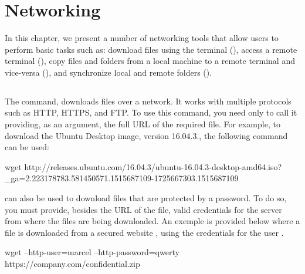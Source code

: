 \chapter{Networking}\label{ch:networking1}

In this chapter, we present a number of networking tools that allow users to perform basic tasks such as: download files using the terminal (), access a remote terminal (), copy files and folders from a local machine to a remote terminal and vice-versa (), and synchronize local and remote folders ().

\section{}

The  command, downloads files over a network. It works with multiple protocols such as \acs{HTTP}, \acs{HTTPS}, and \acs{FTP}. To use this command, you need only to call it providing, as an argument, the full \acs{URL} of the required file. For example, to download the Ubuntu Desktop  image, version 16.04.3., the following command can be used:

\begin{command_line}[make]
wget http://releases.ubuntu.com/16.04.3/ubuntu-16.04.3-desktop-amd64.iso?_ga=2.223178783.581450571.1515687109-1725667303.1515687109
\end{command_line}

 can also be used to download files that are protected by a password. To do so, you must provide, besides the \acs{URL} of the file, valid credentials for the server from where the files are being downloaded. An exemple is provided below where a file  is downloaded from a secured website , using the credentials for the user .

\begin{command_line}[make]
wget --http-user=marcel --http-password=qwerty https://company.com/confidential.zip
\end{command_line}


\section{}

